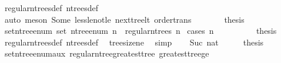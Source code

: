 \begin{isabellebody}
\ regular{\isacharunderscore}{\kern0pt}n{\isacharunderscore}{\kern0pt}trees{\isacharunderscore}{\kern0pt}def\ n{\isacharunderscore}{\kern0pt}trees{\isacharunderscore}{\kern0pt}def\isanewline
\ \ \ \ \ \ \isamarkupfalse%
\ {\isacharparenleft}{\kern0pt}auto{\isacharcomma}{\kern0pt}\ meson\ Some\ less{\isacharunderscore}{\kern0pt}le{\isacharunderscore}{\kern0pt}not{\isacharunderscore}{\kern0pt}le\ next{\isacharunderscore}{\kern0pt}tree{\isacharunderscore}{\kern0pt}lt{\isacharprime}{\kern0pt}\ order{\isachardot}{\kern0pt}trans{\isacharparenright}{\kern0pt}\isanewline
\ \ \ \ \isamarkupfalse%
\ \isamarkupfalse%
\ {\isacharquery}{\kern0pt}thesis\ \isacommand{{\isachardot}{\kern0pt}}\isamarkupfalse%
\isanewline
\ \ \isamarkupfalse%
\isanewline
{}\isamarkupfalse%
%
\endisatagproof
{\isafoldproof}%
%
\isadelimproof
\isanewline
%
\endisadelimproof
\isanewline
{}\isamarkupfalse%
\ set{\isacharunderscore}{\kern0pt}n{\isacharunderscore}{\kern0pt}tree{\isacharunderscore}{\kern0pt}enum{\isacharcolon}{\kern0pt}\ {\isachardoublequoteopen}set\ {\isacharparenleft}{\kern0pt}n{\isacharunderscore}{\kern0pt}tree{\isacharunderscore}{\kern0pt}enum\ n{\isacharparenright}{\kern0pt}\ {\isacharequal}{\kern0pt}\ regular{\isacharunderscore}{\kern0pt}n{\isacharunderscore}{\kern0pt}trees\ n{\isachardoublequoteclose}\isanewline
%
\isadelimproof
%
\endisadelimproof
%
\isatagproof
{}\isamarkupfalse%
\ {\isacharparenleft}{\kern0pt}cases\ n{\isacharparenright}{\kern0pt}\isanewline
\ \ \isamarkupfalse%
\ {}\isanewline
\ \ \isamarkupfalse%
\ \isamarkupfalse%
\ {\isacharquery}{\kern0pt}thesis\ \isamarkupfalse%
\ regular{\isacharunderscore}{\kern0pt}n{\isacharunderscore}{\kern0pt}trees{\isacharunderscore}{\kern0pt}def\ n{\isacharunderscore}{\kern0pt}trees{\isacharunderscore}{\kern0pt}def\ \isamarkupfalse%
\ tree{\isacharunderscore}{\kern0pt}size{\isacharunderscore}{\kern0pt}ne{\isacharunderscore}{\kern0pt}{}\ \isamarkupfalse%
\ simp\isanewline
{}\isamarkupfalse%
\isanewline
\ \ \isamarkupfalse%
\ {\isacharparenleft}{\kern0pt}Suc\ nat{\isacharparenright}{\kern0pt}\isanewline
\ \ \isamarkupfalse%
\ \isamarkupfalse%
\ {\isacharquery}{\kern0pt}thesis\ \isamarkupfalse%
\ set{\isacharunderscore}{\kern0pt}n{\isacharunderscore}{\kern0pt}tree{\isacharunderscore}{\kern0pt}enum{\isacharunderscore}{\kern0pt}aux\ regular{\isacharunderscore}{\kern0pt}n{\isacharunderscore}{\kern0pt}tree{\isacharunderscore}{\kern0pt}greatest{\isacharunderscore}{\kern0pt}tree\ greatest{\isacharunderscore}{\kern0pt}tree{\isacharunderscore}{\kern0pt}ge\isanewline

\end{isabellebody}

